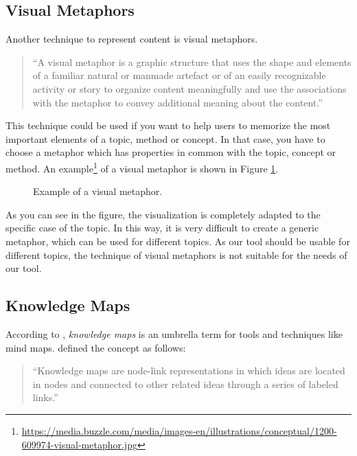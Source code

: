 \subsection{Visual Metaphors}\label{sec:visual-metaphors}
Another technique to represent content is visual metaphors.

\begin{quote}
``A visual metaphor is a graphic structure that uses the shape and elements of a familiar natural or manmade artefact or of an easily recognizable activity or story to organize content meaningfully and use the associations with the metaphor to convey additional meaning about the content.'' \hfill \citep{eppler-2006}
\end{quote}

This technique could be used if you want to help users to memorize the most important elements of a topic, method or concept. In that case, you have to choose a metaphor which has properties in common with the topic, concept or method. \citep{eppler-2006} An example\footnote{\url{https://media.buzzle.com/media/images-en/illustrations/conceptual/1200-609974-visual-metaphor.jpg}} of a visual metaphor is shown in Figure \ref{fig:visual-metaphor}.

\begin{figure}[H]
	\centering
	\caption{Example of a visual metaphor.}
	\label{fig:visual-metaphor}
\end{figure}

As you can see in the figure, the visualization is completely adapted to the specific case of the topic. In this way, it is very difficult to create a generic metaphor, which can be used for different topics. As our tool should be usable for different topics, the technique of visual metaphors is not suitable for the needs of our tool.


\subsection{Knowledge Maps}\label{sec:knowledge-maps}
According to \cite{knowledgemapsbalaid}, \textit{knowledge maps} is an umbrella term for tools and techniques like mind maps. \cite{knowledgemapsodonnell} defined the concept as follows:

\begin{quote}
``Knowledge maps are node-link representations in which ideas are located in nodes and connected to other related ideas through a series of labeled links.'' \hfill 
\end{quote}

